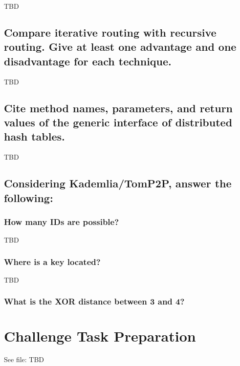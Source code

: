 \documentclass{article}
\begin{document}
TBD

\subsection{Compare iterative routing with recursive routing.
Give at least one advantage and one disadvantage for each technique.}

TBD

\subsection{Cite method names, parameters, and return
values of the generic interface of distributed hash tables.}

TBD

\subsection{Considering Kademlia/TomP2P, answer the following:}
\subsubsection{How many IDs are possible?}

TBD

\subsubsection{Where is a key located?}

TBD

\subsubsection{What is the XOR distance between 3 and 4?}



\section{Challenge Task Preparation}

See file: TBD
\end{document}
